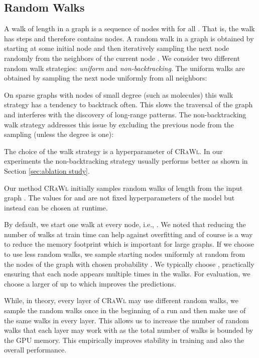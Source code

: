 \documentclass{scrartcl} \usepackage[dvipsnames]{xcolor}
\newcommand{\crawl}{\textsc{CRaWl}}
\begin{document}
\subsection{Random Walks}
    \label{RW}
    A walk of length  in a graph  is a sequence of nodes  with  for all .
    That is, the walk has  steps and therefore contains  nodes.
    A random walk in a graph is obtained by starting at some initial node  and then iteratively sampling the next node  randomly from the neighbors  of the current node .
    We consider two different random walk strategies: \emph{uniform} and \emph{non-backtracking}.
    The uniform walks are obtained by sampling the next node uniformly from all neighbors:
    
On sparse graphs with nodes of small degree (such as molecules) this walk strategy has a tendency to backtrack often.
    This slows the traversal of the graph and interferes with the discovery of long-range patterns.
    The non-backtracking walk strategy addresses this issue by excluding the previous node from the sampling (unless the degree is one):
    
    
The choice of the walk strategy is a hyperparameter of \crawl{}. 
    In our experiments the non-backtracking strategy usually performs better as shown in Section \ref{sec:ablation study}.


    Our method \crawl{} initially samples  random walks  of length  from the input graph .
    The values for  and  are not fixed hyperparameters of the model but instead can be chosen at runtime.
    
    By default, we start one walk at every node, i.e., .
    We noted that reducing the number of walks at train time can help against overfitting and of course is a way to reduce the memory footprint which is important for large graphs.
    If we choose to use less random walks, we sample  starting nodes uniformly at random from the nodes of the graph with chosen probability .
    We typically choose , practically ensuring that each node appears multiple times in the walks.
    For evaluation, we choose a larger  of up to  which improves the predictions.
    
    While, in theory, every layer of \crawl{} may use different random walks, we sample the random walks once in the beginning of a run and then make use of the same walks in every layer. 
    This allows us to increase the number of random walks that each layer may work with as the total number of walks is bounded by the GPU memory.
    This empirically improves stability in training and also the overall performance.
\end{document}
